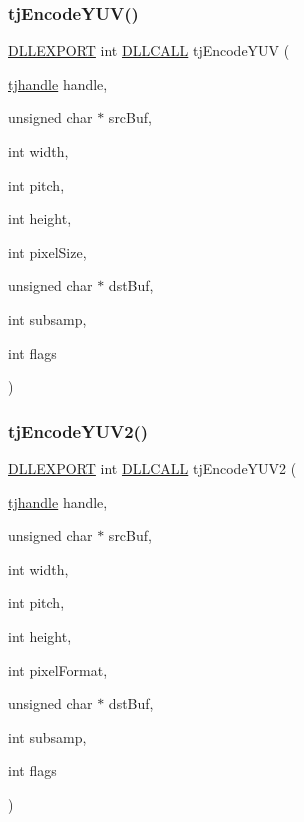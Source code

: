 \subsubsection{\texorpdfstring{tj\+Encode\+Y\+U\+V()}{tjEncodeYUV()}}
{\footnotesize\ttfamily \hyperlink{turbojpeg_8h_a808e08638be3cba36e36759e5b150de0}{D\+L\+L\+E\+X\+P\+O\+RT} int \hyperlink{turbojpeg_8h_a54b25836118bfac94a53a7b790f3ccb2}{D\+L\+L\+C\+A\+LL} tj\+Encode\+Y\+UV (\begin{DoxyParamCaption}\item[{\hyperlink{group___turbo_j_p_e_g_ga758d2634ecb4949de7815cba621f5763}{tjhandle}}]{handle,  }\item[{unsigned char $\ast$}]{src\+Buf,  }\item[{int}]{width,  }\item[{int}]{pitch,  }\item[{int}]{height,  }\item[{int}]{pixel\+Size,  }\item[{unsigned char $\ast$}]{dst\+Buf,  }\item[{int}]{subsamp,  }\item[{int}]{flags }\end{DoxyParamCaption})}

\mbox{\label{group___turbo_j_p_e_g_ga0fa4e7b1943687c6a0c0304529c55d35}} 
\subsubsection{\texorpdfstring{tj\+Encode\+Y\+U\+V2()}{tjEncodeYUV2()}}
{\footnotesize\ttfamily \hyperlink{turbojpeg_8h_a808e08638be3cba36e36759e5b150de0}{D\+L\+L\+E\+X\+P\+O\+RT} int \hyperlink{turbojpeg_8h_a54b25836118bfac94a53a7b790f3ccb2}{D\+L\+L\+C\+A\+LL} tj\+Encode\+Y\+U\+V2 (\begin{DoxyParamCaption}\item[{\hyperlink{group___turbo_j_p_e_g_ga758d2634ecb4949de7815cba621f5763}{tjhandle}}]{handle,  }\item[{unsigned char $\ast$}]{src\+Buf,  }\item[{int}]{width,  }\item[{int}]{pitch,  }\item[{int}]{height,  }\item[{int}]{pixel\+Format,  }\item[{unsigned char $\ast$}]{dst\+Buf,  }\item[{int}]{subsamp,  }\item[{int}]{flags }\end{DoxyParamCaption})}

